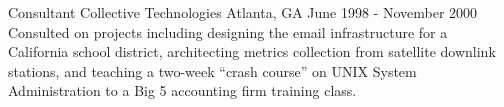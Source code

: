 \begin{cventries}
  \cventry
    {Consultant} %
    {Collective Technologies} %
    {Atlanta, GA} %
    {June 1998 - November 2000} %
    {Consulted on projects including designing the email infrastructure for a California school district, architecting metrics collection from satellite downlink stations, and teaching a two-week “crash course” on UNIX System Administration to a Big 5 accounting firm training class.}

\end{cventries}
